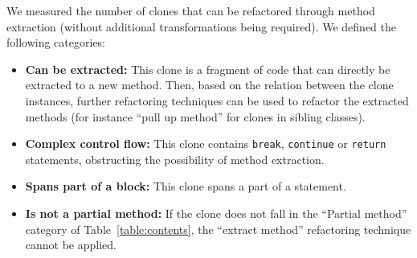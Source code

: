 We measured the number of clones that can be refactored through method extraction (without additional transformations being required). We defined the following categories:
\begin{itemize}
    \item \textbf{Can be extracted:} This clone is a fragment of code that can directly be extracted to a new method. Then, based on the relation between the clone instances, further refactoring techniques can be used to refactor the extracted methods (for instance ``pull up method'' for clones in sibling classes).
    \item \textbf{Complex control flow:} This clone contains \texttt{break}, \texttt{continue} or \texttt{return} statements, obstructing the possibility of method extraction.
    \item \textbf{Spans part of a block:} This clone spans a part of a statement.
    \item \textbf{Is not a partial method:} If the clone does not fall in the ``Partial method'' category of Table~\ref{table:contents}, the ``extract method'' refactoring technique cannot be applied.
\end{itemize}

